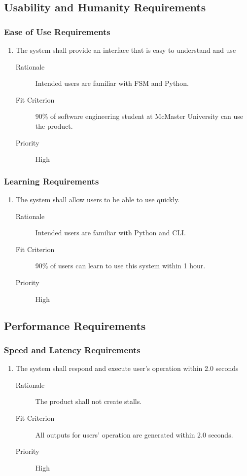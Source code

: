 \documentclass[12pt, titlepage]{article}
\begin{document}
\subsection{Usability and Humanity Requirements}
\subsubsection{Ease of Use Requirements}
\begin{enumerate}[resume*=NFR]
\item The system shall provide an interface that is easy to understand and use
  \begin{description}
  \item[Rationale] Intended users are familiar with FSM and Python.
  \item[Fit Criterion] 90\% of software engineering student at McMaster University
    can use the product.
  \item[Priority] High
  \end{description}
\end{enumerate}

\subsubsection{Learning Requirements}
\begin{enumerate}[resume*=NFR]
\item The system shall allow users to be able to use quickly.
  \begin{description}
  \item[Rationale] Intended users are familiar with Python and CLI.
  \item[Fit Criterion] 90\% of users can learn to use this system within 1 hour.
  \item[Priority] High
  \end{description}

\end{enumerate}

\subsection{Performance Requirements}
\subsubsection{Speed and Latency Requirements}
\begin{enumerate}[resume*=NFR]
\item The system shall respond and execute user's operation within 2.0 seconds
  \begin{description}
  \item[Rationale] The product shall not create stalls.
  \item[Fit Criterion] All outputs for users' operation are generated within 2.0
    seconds.
  \item[Priority] High
  \end{description}

\end{enumerate}
\end{document}
